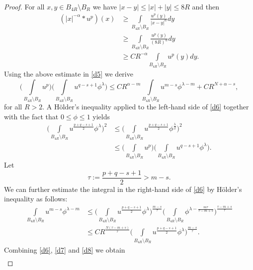 \documentclass[10pt,a4paper]{amsart}
\numberwithin{equation}{section}
\begin{document}
\begin{proof}
For all $x,y\in B_{4R}\setminus B_R$ we have $|x-y|\leq |x|+|y|\leq 8R$ and then
$$
\begin{aligned}
(|x|^{-\alpha}*u^p)(x)&\geq \int\limits_{B_{4R}\setminus B_{R}}\frac{u^{p}(y)}{|x-y|^{\alpha}}dy\\
&\geq \int\limits_{B_{4R}\setminus B_{R}}\frac{u^{p}(y)}{(8R)^{\alpha}}dy\\
&\geq CR^{-\alpha}\int\limits_{B_{4R}\setminus B_R}u^{p}(y)dy.
\end{aligned}
$$
Using the above estimate in \eqref{d5} we derive
\begin{equation}\label{d6}
\Big(\int\limits_{B_{4R}\setminus B_R}u^{p}\Big) \Big(\int\limits_{B_{4R}\setminus B_R} u^{q-s+1}\phi^\lambda \Big) \leq CR^{\alpha-m}\int\limits_{B_{4R}\setminus B_R} u^{m-s}\phi^{\lambda-m} +CR^{N+\alpha-s},
\end{equation}
for all $R>2$. A H\"older's inequality applied to the left-hand side of \eqref{d6} together with the fact that $0\leq \phi\leq 1$ yields
\begin{equation}\label{d7}
\begin{aligned}
\Big(\int\limits_{B_{4R}\setminus B_R} u^{\frac{p+q-s+1}{2}}\phi^\lambda \Big)^2&\leq \Big(\int\limits_{B_{4R}\setminus B_R} u^{\frac{p+q-s+1}{2}}\phi^{\frac{\lambda}{2}} \Big)^2\\
&\leq \Big( \int\limits_{B_{4R}\setminus B_R}u^{p}\Big) \Big(\int\limits_{B_{4R}\setminus B_R} u^{q-s+1}\phi^\lambda \Big).
\end{aligned}
\end{equation}
Let 
$$\tau:=\frac{p+q-s+1}{2}>m-s.
$$ 
We can further estimate the integral in the right-hand side of \eqref{d6} by H\"older's inequality as follows:
\begin{equation}\label{d8}
\begin{aligned}
\int\limits_{B_{4R}\setminus B_R} u^{m-s}\phi^{\lambda-m}
&\leq \Big(\int\limits_{B_{4R}\setminus B_R} u^{\frac{p+q-s+1}{2}}\phi^{\lambda}\Big)^{\frac{m-s}{\tau}}\Big(\int\limits_{B_{4R}\setminus B_R} \phi^{\lambda-\frac{m\tau}{\tau-m+s}}\Big)^{\frac{\tau-m+s}{\tau}}\\
&\leq CR^{\frac{N(\tau-m+s)}{\tau}} \Big(\int\limits_{B_{4R}\setminus B_R} u^{\frac{p+q-s+1}{2}}\phi^{\lambda}\Big)^{\frac{m-s}{\tau}}.
\end{aligned}
\end{equation}
Combining \eqref{d6}, \eqref{d7} and \eqref{d8} we obtain
\begin{equation}\label{d9}
\begin{aligned}

\end{aligned}
\end{equation}
\end{proof}
\end{document}
